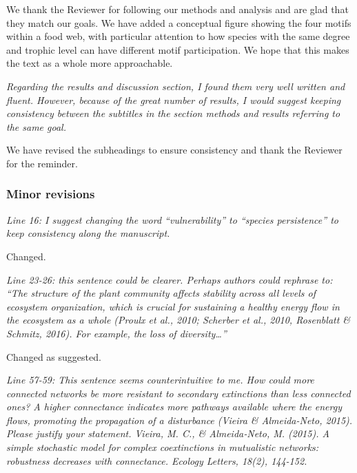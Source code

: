 \documentclass[12pt]{article}
\newcommand{\us}{\rm \setlength{\leftskip}{0.3cm} \setlength{\rightskip}{0.3cm}}
\newcommand{\them}{\it \setlength{\leftskip}{0cm} \setlength{\rightskip}{0cm}}
\begin{document}
    \us  We thank the Reviewer for following our methods and analysis and are glad that they match our goals. We have added a conceptual figure showing the four motifs within a food web, with particular attention to how species with the same degree and trophic level can have different motif participation. We hope that this makes the text as a whole more approachable.
    
    \them
    Regarding the results and discussion section, I found them very well written and fluent. However, because of the great number of results, I would suggest keeping consistency between the subtitles in the section methods and results referring to the same goal.
    
    \us We have revised the subheadings to ensure consistency and thank the Reviewer for the reminder.

    \subsubsection*{Minor revisions}

        \them
        Line 16: I suggest changing the word “vulnerability” to “species persistence” to keep consistency along the manuscript.
        
        \us
        Changed.
        
        \them
        Line 23-26: this sentence could be clearer. Perhaps authors could rephrase to: “The structure of the plant community affects stability across all levels of ecosystem organization, which is crucial for sustaining a healthy energy flow in the ecosystem as a whole (Proulx et al., 2010; Scherber et al., 2010, Rosenblatt \& Schmitz, 2016). For example, the loss of diversity…”
        
        \us Changed as suggested.
        
        \them
        Line 57-59: This sentence seems counterintuitive to me. How could more connected networks be more resistant to secondary extinctions than less connected ones? A higher connectance indicates more pathways available where the energy flows, promoting the propagation of a disturbance (Vieira \& Almeida-Neto, 2015). Please justify your statement.
        Vieira, M. C., \& Almeida‐Neto, M. (2015). A simple stochastic model for complex coextinctions in mutualistic networks: robustness decreases with connectance. Ecology Letters, 18(2), 144-152.
        
\end{document}
